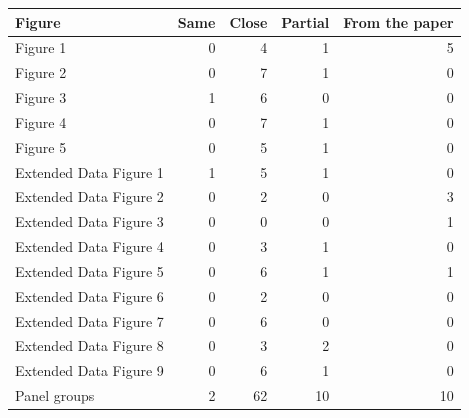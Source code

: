 \begin{tabular}{@{}lrrrr@{}}
\toprule
Figure & Same & Close & Partial & From the paper \\
\midrule
Figure 1 & 0 & 4 & 1 & 5 \\
Figure 2 & 0 & 7 & 1 & 0 \\
Figure 3 & 1 & 6 & 0 & 0 \\
Figure 4 & 0 & 7 & 1 & 0 \\
Figure 5 & 0 & 5 & 1 & 0 \\
Extended Data Figure 1 & 1 & 5 & 1 & 0 \\
Extended Data Figure 2 & 0 & 2 & 0 & 3 \\
Extended Data Figure 3 & 0 & 0 & 0 & 1 \\
Extended Data Figure 4 & 0 & 3 & 1 & 0 \\
Extended Data Figure 5 & 0 & 6 & 1 & 1 \\
Extended Data Figure 6 & 0 & 2 & 0 & 0 \\
Extended Data Figure 7 & 0 & 6 & 0 & 0 \\
Extended Data Figure 8 & 0 & 3 & 2 & 0 \\
Extended Data Figure 9 & 0 & 6 & 1 & 0 \\
\midrule
Panel groups & 2 & 62 & 10 & 10 \\
\bottomrule
\end{tabular}
